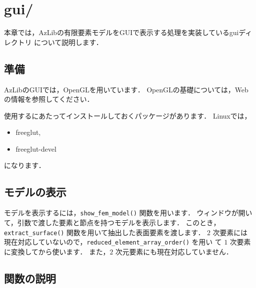 \chapter{gui/} \label{chap:gui}

本章では，AzLibの有限要素モデルをGUIで表示する処理を実装しているguiディレクトリ
について説明します．


\section{準備}

AzLibのGUIでは，OpenGLを用いています．
OpenGLの基礎については，Webの情報を参照してください．

使用するにあたってインストールしておくパッケージがあります．
Linuxでは，
\begin{itemize}
\item freeglut,
\item freeglut-devel
\end{itemize}
になります．


\section{モデルの表示}

モデルを表示するには，\verb|show_fem_model()| 関数を用います．
ウィンドウが開いて，引数で渡した要素と節点を持つモデルを表示します．
このとき，\verb|extract_surface()| 関数を用いて抽出した表面要素を渡します．
$2$ 次要素には現在対応していないので，\verb|reduced_element_array_order()| を用い
て $1$ 次要素に変換してから使います．
また，$2$ 次元要素にも現在対応していません．

\section{関数の説明}


